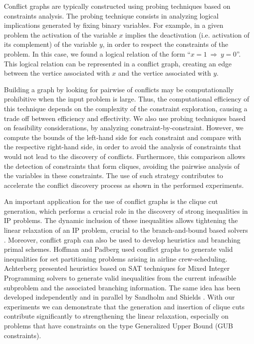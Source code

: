 \documentclass{endm}
\begin{document}
Conflict graphs are typically constructed using probing techniques \cite{Borndorfer1998} based on constraints analysis. The probing technique consists in analyzing logical implications generated by fixing binary variables. For example, in a given problem the activation of the variable $x$ implies the deactivation (i.e. activation of its complement) of the variable $y$, in order to respect the constraints of the problem. In this case, we found a logical relation of the form ``$x = 1 \ \Rightarrow \ y = 0$''. This logical relation can be represented in a conflict graph, creating an edge between the vertice associated with $x$ and the vertice associated with $y$.

Building a graph by looking for pairwise of conflicts may be computationally prohibitive when the input problem is large. Thus, the computational efficiency of this technique depends on the complexity of the constraint exploration, causing a trade off between efficiency and effectivity. We also use probing techniques based on feasibility considerations, by analyzing constraint-by-constraint. However, we compute the bounds of the left-hand side for each constraint and compare with the respective right-hand side, in order to avoid the analysis of constraints that would not lead to the discovery of conflicts. Furthermore, this comparison allows the detection of constraints that form cliques, avoiding the pairwise analysis of the variables in these constraints. The use of such strategy contributes to accelerate the conflict discovery process as shown in the performed experiments.

An important application for the use of conflict graphs is the clique cut generation, which performs a crucial role in the discovery of strong inequalities \cite{chvatal} in IP problems. The dynamic inclusion of these inequalities allows tightening the linear relaxation of an IP problem, crucial to the branch-and-bound based solvers \cite{atamturk}. Moreover, conflict graph can also be used to develop heuristics and branching primal schemes. Hoffman and Padberg \cite{hoffman} used conflict graphs to generate valid inequalities for set partitioning problems arising in airline crew-scheduling. Achterberg \cite{achterberg} presented heuristics based on SAT techniques for Mixed Integer Programming solvers to generate valid inequalities from the current infeasible subproblem and the associated branching information. The same idea has been developed independently and in parallel by Sandholm and Shields \cite{sandholm}. With our experiments we can demonstrate that the generation and insertion of clique cuts contribute significantly to strengthening the linear relaxation, especially on problems that have constraints on the type Generalized Upper Bound (GUB constraints).
\end{document}
